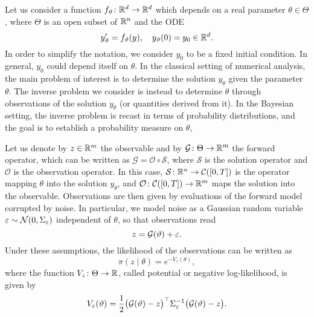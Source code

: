\documentclass[10pt]{article}
\begin{document}
Let us consider a function $f_\vartheta \colon \mathbb{R}^d \to \mathbb{R}^d$ which depends on a real parameter $\theta \in \Theta$, where $\Theta$ is an open subset of $\mathbb{R}^n$ and the ODE
\begin{equation}\label{eq:ODEParam}
	y_\vartheta' = f_\vartheta(y), \quad y_\vartheta(0) = y_0 \in \mathbb{R}^d.
\end{equation}
In order to simplify the notation, we consider $y_0$ to be a fixed initial condition. In general, $y_0$ could depend itself on $\theta$. In the classical setting of numerical analysis, the main problem of interest is to determine the solution $y_\theta$ given the parameter $\theta$. The inverse problem we consider is instead to determine $\theta$ through observations of the solution $y_\theta$ (or quantities derived from it). In the Bayesian setting, the inverse problem is recast in terms of probability distributions, and the goal is to establish a probability measure on $\theta$, 

Let us denote by $z \in \mathbb{R}^m$ the observable and by $\mathcal G\colon \Theta \to \mathbb{R}^m$ the forward operator, which can be written as $\mathcal G = \mathcal O \circ \mathcal S$, where $\mathcal S$ is the solution operator and $\mathcal O$ is the observation operator. In this case, $\mathcal S \colon \mathbb{R}^n \to \mathcal C([0, T])$ is the operator mapping $\theta$ into the solution $y_\theta$, and $\mathcal O \colon \mathcal C([0, T]) \to \mathbb{R}^m$ maps the solution into the observable. Observations are then given by evaluations of the forward model corrupted by noise. In particular, we model noise as a Gaussian random variable $\varepsilon \sim \mathcal{N}(0, \Sigma_\varepsilon)$ independent of $\theta$, so that observations read
\begin{equation}
	z = \mathcal{G}(\vartheta) + \varepsilon.
\end{equation}
Under these assumptions, the likelihood of the observations can be written as
\begin{equation}\label{eq:Likelihood}
	\pi(z \mid \theta) = e^{-V_z(\theta)},
\end{equation}
where the function $V_z\colon\Theta \to \mathbb{R}$, called  potential or negative log-likelihood, is given by
\begin{equation}\label{eq:Potential}
	V_z(\vartheta) = \frac{1}{2}\big(\mathcal{G}(\vartheta) - z\big)^\top \Sigma_\varepsilon^{-1} \big(\mathcal{G}(\vartheta) - z\big).
\end{equation}
\end{document}
